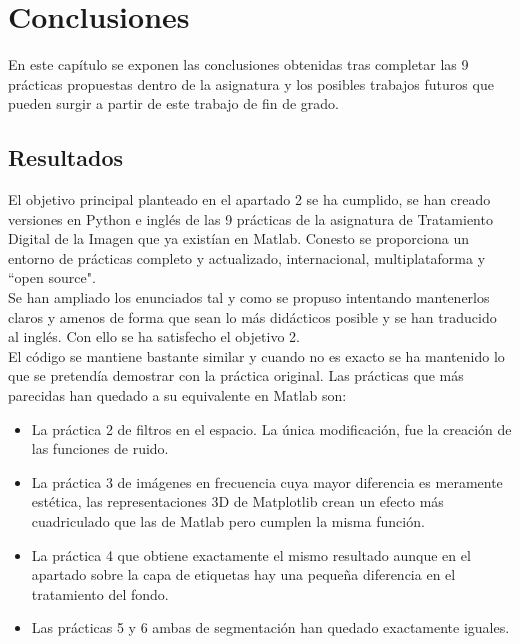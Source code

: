 \chapter{Conclusiones}
En este capítulo se exponen las conclusiones obtenidas tras completar las 9 prácticas propuestas dentro de la asignatura y los posibles trabajos futuros que pueden surgir a partir de este trabajo de fin de grado. 

\section{Resultados}
El objetivo principal planteado en el apartado 2 se ha cumplido, se han creado versiones en Python e inglés de las 9 prácticas de la asignatura de Tratamiento Digital de la Imagen que ya existían en Matlab. Conesto se proporciona un entorno de prácticas completo y actualizado, internacional, multiplataforma y ``open source".\\

Se han ampliado los enunciados tal y como se propuso intentando mantenerlos claros y amenos de forma que sean lo más didácticos posible y se han traducido al inglés. Con ello se ha satisfecho el objetivo 2.\\

El código se mantiene bastante similar y cuando no es exacto se ha mantenido lo que se pretendía demostrar con la práctica original. Las prácticas que más parecidas han quedado a su equivalente en Matlab son:
\begin{itemize}
    \item La práctica 2 de filtros en el espacio. La única modificación, fue la creación de las funciones de ruido.
    \item La práctica 3 de imágenes en frecuencia cuya mayor diferencia es meramente estética, las representaciones 3D de Matplotlib crean un efecto más cuadriculado que las de Matlab pero cumplen la misma función.
    \item La práctica 4 que obtiene exactamente el mismo resultado aunque en el apartado sobre la capa de etiquetas hay una pequeña diferencia en el tratamiento del fondo.
    \item Las prácticas 5 y 6 ambas de segmentación han quedado exactamente iguales.\\
\end{itemize}

